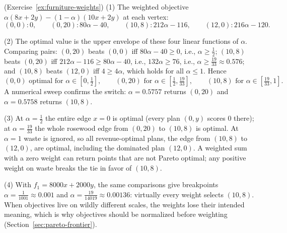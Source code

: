\begin{solution}(Exercise~\ref{ex:furniture-weights})
(1) The weighted objective $\alpha(8x + 2y) - (1-\alpha)(10x + 2y)$ at each vertex:
\[
(0,0): 0, \qquad
(0,20): 80\alpha - 40, \qquad
(10,8): 212\alpha - 116, \qquad
(12,0): 216\alpha - 120.
\]

(2) The optimal value is the upper envelope of these four linear functions of $\alpha$. Comparing pairs: $(0,20)$ beats $(0,0)$ iff $80\alpha - 40 \geq 0$, i.e., $\alpha \geq \tfrac12$; $(10,8)$ beats $(0,20)$ iff $212\alpha - 116 \geq 80\alpha - 40$, i.e., $132\alpha \geq 76$, i.e., $\alpha \geq \tfrac{19}{33} \approx 0.576$; and $(10,8)$ beats $(12,0)$ iff $4 \geq 4\alpha$, which holds for all $\alpha \leq 1$. Hence
\[
(0,0) \text{ optimal for } \alpha \in [0, \tfrac12], \qquad
(0,20) \text{ for } \alpha \in [\tfrac12, \tfrac{19}{33}], \qquad
(10,8) \text{ for } \alpha \in [\tfrac{19}{33}, 1].
\]
A numerical sweep confirms the switch: $\alpha = 0.5757$ returns $(0,20)$ and $\alpha = 0.5758$ returns $(10,8)$.

(3) At $\alpha = \tfrac12$ the entire edge $x = 0$ is optimal (every plan $(0,y)$ scores $0$ there); at $\alpha = \tfrac{19}{33}$ the whole rosewood edge from $(0,20)$ to $(10,8)$ is optimal. At $\alpha = 1$ waste is ignored, so all revenue-optimal plans, the edge from $(10,8)$ to $(12,0)$, are optimal, including the dominated plan $(12,0)$. A weighted sum with a zero weight can return points that are not Pareto optimal; any positive weight on waste breaks the tie in favor of $(10,8)$.

(4) With $f_1 = 8000x + 2000y$, the same comparisons give breakpoints $\alpha = \tfrac{1}{1001} \approx 0.001$ and $\alpha = \tfrac{19}{14019} \approx 0.00136$: virtually every weight selects $(10,8)$. When objectives live on wildly different scales, the weights lose their intended meaning, which is why objectives should be normalized before weighting (Section~\ref{sec:pareto-frontier}).
\end{solution}
